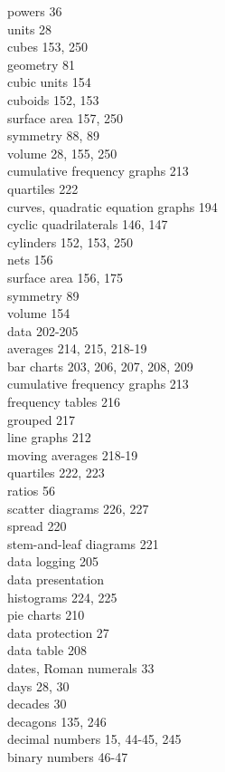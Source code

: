 \documentclass[10pt]{article}
\begin{document}
powers 36\\
units 28\\
cubes 153, 250\\
geometry 81\\
cubic units 154\\
cuboids 152, 153\\
surface area 157, 250\\
symmetry 88, 89\\
volume 28, 155, 250\\
cumulative frequency graphs 213\\
quartiles 222\\
curves, quadratic equation graphs 194\\
cyclic quadrilaterals 146, 147\\
cylinders 152, 153, 250\\
nets 156\\
surface area 156, 175\\
symmetry 89\\
volume 154\\
data 202-205\\
averages 214, 215, 218-19\\
bar charts 203, 206, 207, 208, 209\\
cumulative frequency graphs 213\\
frequency tables 216\\
grouped 217\\
line graphs 212\\
moving averages 218-19\\
quartiles 222, 223\\
ratios 56\\
scatter diagrams 226, 227\\
spread 220\\
stem-and-leaf diagrams 221\\
data logging 205\\
data presentation\\
histograms 224, 225\\
pie charts 210\\
data protection 27\\
data table 208\\
dates, Roman numerals 33\\
days 28, 30\\
decades 30\\
decagons 135, 246\\
decimal numbers 15, 44-45, 245\\
binary numbers 46-47\\
\end{document}
